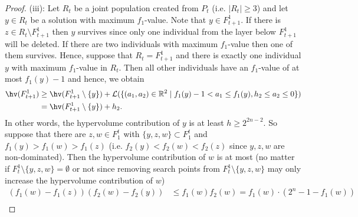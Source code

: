 {\begin{proof}
    (iii): Let $R_t$ be a joint population created from $P_t$ (i.e. $|R_t| \geq 3$) and let $y \in R_t$ be a solution with maximum $f_1$-value. Note that $y \in F_{t+1}^1$. If there is $z \in R_t \setminus F_{t+1}^1$ then $y$ survives since only one individual from the layer below $F_{t+1}^1$ will be deleted. If there are two individuals with maximum $f_1$-value then one of them survives. Hence, suppose that $R_t = F_{t+1}^1$ and there is exactly one individual $y$ with maximum $f_1$-value in $R_t$. Then all other individuals have an $f_1$-value of at most $f_1(y)-1$ and hence, we obtain
    \begin{align*}
    \hv(F_{t+1}^1) &\geq \hv(F_{t+1}^1 \setminus \{y\})+\mathcal{L}(\{(a_1,a_2) \in \mathbb{R}^2 \mid f_1(y)-1<a_1\leq f_1(y), h_2 \leq a_2 \leq 0\}) \\
    &= \hv(F_{t+1}^1 \setminus \{y\})+h_2.
    \end{align*}
    In other words, the hypervolume contribution of $y$ is at least $h \geq 2^{2n-2}$.  
    So suppose that there are $z,w \in F_1^t$ with $\{y,z,w\} \subset F_1^t$ and $f_1(y)>f_1(w)>f_1(z)$ (i.e. $f_2(y)<f_2(w)<f_2(z)$ since $y,z,w$ are non-dominated). Then the hypervolume contribution of $w$ is at most (no matter if $F_t^1 \setminus \{y,z,w\} = \emptyset$ or not since removing search points from $F_t^1 \setminus \{y,z,w\}$ may only increase the hypervolume contribution of $w$)
    \begin{align*}
    (f_1(w)-f_1(z))(f_2(w)-f_2(y)) &\leq f_1(w)f_2(w) = f_1(w) \cdot (2^n-1 - f_1(w))\\

\end{align*}
\end{proof}}
